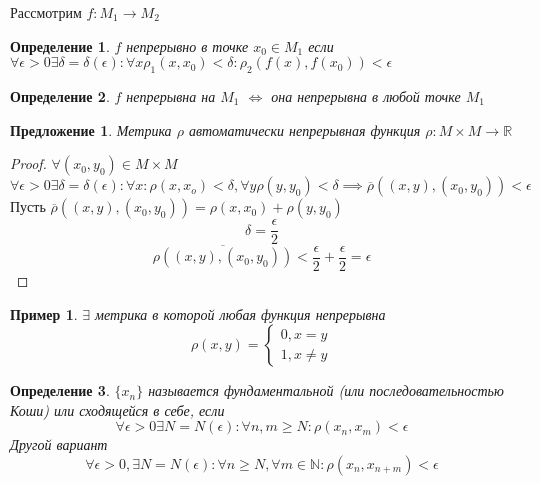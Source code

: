 \documentclass[14pt]{extarticle}
\newtheorem{definition}{Определение}
\newtheorem{pred}{Предложение}[section]
\newtheorem{example}{Пример}[definition]
\begin{document}
Рассмотрим $f : M_1 \to M_2$
\begin{definition}
	$f$ непрерывно в точке  $x_0 \in M_1$ если
	$\forall  \epsilon > 0 \exists  \delta = \delta(\epsilon) :
	\forall x \rho_1(x,x_0) < \delta : \rho_2(f(x),f(x_0)) < \epsilon$
\end{definition}
\begin{definition}
	 $f$ непрерывна на  $M_1$ $\iff$ она непрерывна в любой точке
	  $M_1$
\end{definition}
\begin{pred}
	Метрика $\rho$ автоматически непрерывная функция
	 $\rho: M \times M \to \mathbb{R}$
\end{pred}
\begin{proof}
	$\forall  (x_0,y_0) \in M \times M$ 
	\begin{equation}
	\forall  \epsilon > 0 \exists  \delta = \delta(\epsilon) :
	\forall x: \rho(x,x_o) < \delta,
	\forall  y  \rho(y,y_0) < \delta 
	\implies 
	\overline{\rho} ((x,y),(x_0,y_0)) < \epsilon
	\end{equation} 
	Пусть $\overline{\rho}((x,y),(x_0,y_0)) = \rho(x,x_0)+\rho(y,y_0)$
	\begin{equation}
	\delta = \frac{\epsilon}{2}
	\end{equation} 
	\begin{equation}
	\overline{\rho((x,y),(x_0,y_0))} < \frac{\epsilon}{2} +
	\frac{\epsilon}{2} = \epsilon
	\end{equation} 
\end{proof}
\begin{example}
	$\exists $ метрика в которой любая функция непрерывна
	\begin{equation}
	\rho(x,y) = 
	\begin{cases}
		0, x= y\\
		1, x\neq y
	\end{cases}
	\end{equation} 
\end{example}
\begin{definition}
	$\{x_{n}\}$ называется фундаментальной (или последовательностью Коши) или сходящейся в себе, если 
	\begin{equation}
	\forall  \epsilon > 0 \exists  N=N(\epsilon) :
	\forall n , m \ge  N : \rho(x_{n},x_{m}) < \epsilon
	\end{equation} 
	Другой вариант 
	\begin{equation}
	\forall  \epsilon  > 0, \exists  N = N(\epsilon) :
	\forall n \ge  N , \forall m \in \mathbb{N}:
	\rho(x_{n},x_{n + m}) < \epsilon
	\end{equation} 
\end{definition}
\end{document}
